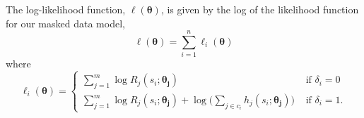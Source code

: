 \documentclass[
]{article}
\begin{document}
\begin{theorem}
\label{thm:loglike_total}
The log-likelihood function, $\ell(\boldsymbol{\theta})$, is given by
the log of the likelihood function for our masked data model,
\begin{equation}
\label{eq:loglike}
\ell(\boldsymbol{\theta}) = \sum_{i=1}^n \ell_i(\boldsymbol{\theta})
\end{equation}
where
\begin{equation}
\ell_i(\boldsymbol{\theta}) = 
\begin{cases}
\sum_{j=1}^m \log R_j(s_i;\boldsymbol{\theta_j}) &\text{ if } \delta_i = 0\\
\sum_{j=1}^m \log R_j(s_i;\boldsymbol{\theta_j}) +
    \log \bigl(\sum_{j\in c_i} h_j(s_i;\boldsymbol{\theta_j}) \bigr) &\text{ if } \delta_i = 1.
\end{cases}
\end{equation}
\end{theorem}
\end{document}
